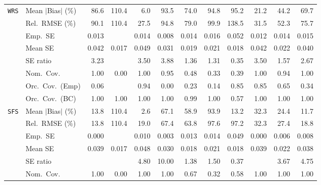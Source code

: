 \begin{landscape}
\begin{longtable}{llrrrrrrrrrr}
\addlinespace[2pt]
\quad \texttt{WRS} & Mean $|$Bias$|$ (\%) & 86.6 & 110.4 & \cellcolor{rankone}6.0 & 93.5 & 74.0 & 94.8 & 95.2 & \cellcolor{ranktwo}21.2 & \cellcolor{rankthree}44.2 & 69.7 \\
 & Rel.\ RMSE (\%) & 90.1 & 110.4 & \cellcolor{rankone}27.5 & 94.8 & 79.0 & 99.9 & 138.5 & \cellcolor{ranktwo}31.5 & \cellcolor{rankthree}52.3 & 75.7 \\
 & Emp.\ SE & 0.013 &  & 0.014 & 0.008 & 0.014 & 0.016 & 0.052 & 0.012 & 0.014 & 0.015 \\
 & Mean SE & 0.042 & 0.017 & 0.049 & 0.031 & 0.019 & 0.021 & 0.018 & 0.042 & 0.022 & 0.040 \\
 & SE ratio & 3.23 &  & 3.50 & 3.88 & \cellcolor{ranktwo}1.36 & \cellcolor{rankone}1.31 & 0.35 & 3.50 & \cellcolor{rankthree}1.57 & 2.67 \\
 & Nom.\ Cov. & \cellcolor{rankthree}1.00 & 0.00 & \cellcolor{rankthree}1.00 & \cellcolor{rankone}0.95 & 0.48 & 0.33 & 0.39 & \cellcolor{rankthree}1.00 & \cellcolor{ranktwo}0.94 & \cellcolor{rankthree}1.00 \\
 & Orc.\ Cov.\ (Emp) & 0.06 &  & \cellcolor{rankone}0.94 & 0.00 & 0.23 & 0.14 & \cellcolor{ranktwo}0.85 & \cellcolor{ranktwo}0.85 & \cellcolor{rankthree}0.65 & 0.34 \\
 & Orc.\ Cov.\ (BC) & \cellcolor{ranktwo}1.00 & \cellcolor{ranktwo}1.00 & \cellcolor{ranktwo}1.00 & \cellcolor{ranktwo}1.00 & \cellcolor{rankone}0.99 & \cellcolor{ranktwo}1.00 & \cellcolor{rankthree}0.57 & \cellcolor{ranktwo}1.00 & \cellcolor{ranktwo}1.00 & \cellcolor{ranktwo}1.00 \\
\addlinespace[2pt]
\quad \texttt{SFS} & Mean $|$Bias$|$ (\%) & 13.8 & 110.4 & \cellcolor{rankone}2.6 & 67.1 & 58.9 & 93.9 & \cellcolor{rankthree}13.2 & 32.3 & 24.4 & \cellcolor{ranktwo}11.7 \\
 & Rel.\ RMSE (\%) & \cellcolor{rankone}13.8 & 110.4 & \cellcolor{rankthree}19.0 & 67.4 & 63.8 & 97.6 & 97.2 & 32.3 & 27.4 & \cellcolor{ranktwo}18.8 \\
 & Emp.\ SE & 0.000 &  & 0.010 & 0.003 & 0.013 & 0.014 & 0.049 & 0.000 & 0.006 & 0.008 \\
 & Mean SE & 0.039 & 0.017 & 0.048 & 0.030 & 0.018 & 0.021 & 0.018 & 0.039 & 0.022 & 0.038 \\
 & SE ratio &  &  & 4.80 & 10.00 & \cellcolor{rankone}1.38 & \cellcolor{ranktwo}1.50 & \cellcolor{rankthree}0.37 &  & 3.67 & 4.75 \\
 & Nom.\ Cov. & \cellcolor{rankone}1.00 & 0.00 & \cellcolor{rankone}1.00 & \cellcolor{rankone}1.00 & \cellcolor{ranktwo}0.67 & 0.32 & \cellcolor{rankthree}0.58 & \cellcolor{rankone}1.00 & \cellcolor{rankone}1.00 & \cellcolor{rankone}1.00 \\

\end{longtable}
\end{landscape}
